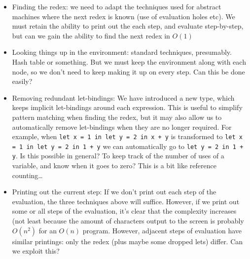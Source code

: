 \documentclass[10pt]{article}
\begin{document}
\begin{itemize}

\item Finding the redex: we need to adapt the techniques used for abstract machines where the next redex is known (use of evaluation holes etc). We must retain the ability to print out the each step, and evaluate step-by-step, but can we gain the ability to find the next redex in $O(1)$

\item Looking things up in the environment: standard techniques, presumably. Hash table or something. But we must keep the environment along with each node, so we don't need to keep making it up on every step. Can this be done easily?

\item Removing redundant let-bindings: We have introduced a new type, which keeps implicit let-bindings around each expression. This is useful to simplify pattern matching when finding the redex, but it may also allow us to automatically remove let-bindings when they are no longer required. For example, when \texttt{let x = 1 in let y = 2 in x + y} is transformed to \texttt{let x = 1 in let y = 2 in 1 + y} we can automatically go to \texttt{let y = 2 in 1 + y}. Is this possible in general? To keep track of the number of uses of a variable, and know when it goes to zero? This is a bit like reference counting\ldots

\item Printing out the current step: If we don't print out each step of the evaluation, the three techniques above will suffice. However, if we print out some or all steps of the evaluation, it's clear that the complexity increases (not least because the amount of characters output to the screen is probably $O(n^2)$ for an $O(n)$ program. However, adjacent steps of evaluation have similar printings: only the redex (plus maybe some dropped lets) differ. Can we exploit this?

\end{itemize}
\end{document}
